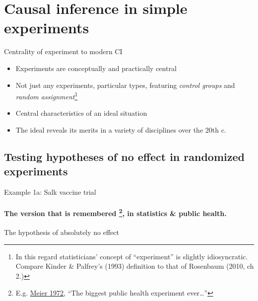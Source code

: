 \section{Causal inference in simple experiments}

\begin{frame}{Centrality of experiment to modern CI}
  \begin{itemize}
  \item Experiments are conceptually and practically central
  \item Not just any experiments, particular types, featuring
    \textit{control groups} and \textit{random assignment}\footnote{In
    this regard statisticians' concept of ``experiment'' is slightly
    idiosyncratic.  Compare Kinder \& Palfrey's (1993) definition to that of
    Rosenbaum (2010, ch 2.)}
  \item Central characteristics of an ideal situation
  \item The ideal reveals its merits in a variety of disciplines over
    the 20th c.
  \end{itemize}
\end{frame}

\subsection{Testing hypotheses of no effect in randomized experiments}
\begin{frame}{Example 1a: Salk vaccine trial}
\framesubtitle{
   The version that is remembered \footnote{E.g.
      \href{http://www.cengage.com/resource_uploads/downloads/0534094929_46500.pdf}{Meier
        1972}, ``The biggest public health experiment ever\ldots''}, in statistics \& public health. }



\end{frame}

\begin{frame}{The hypothesis of absolutely no effect}

    \vfill
  \end{frame}


